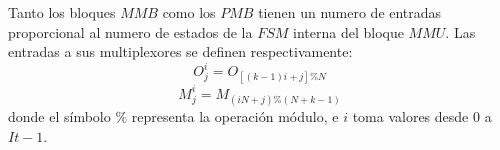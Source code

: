 Tanto los bloques $MMB$ como los $PMB$ tienen un numero de entradas proporcional
al numero de estados de la $FSM$ interna del bloque $MMU$. Las entradas
a sus multiplexores se definen respectivamente: 
\begin{equation}%
  O_j^i = O_{[(k-1)i+j]\%N}
\end{equation}
\begin{equation}%
  M_j^i = M_{(iN+j)\%(N+k-1)}
\end{equation}
donde el símbolo $ \% $ representa la operación módulo, e $i$ toma valores desde
$0$ a $It-1$.